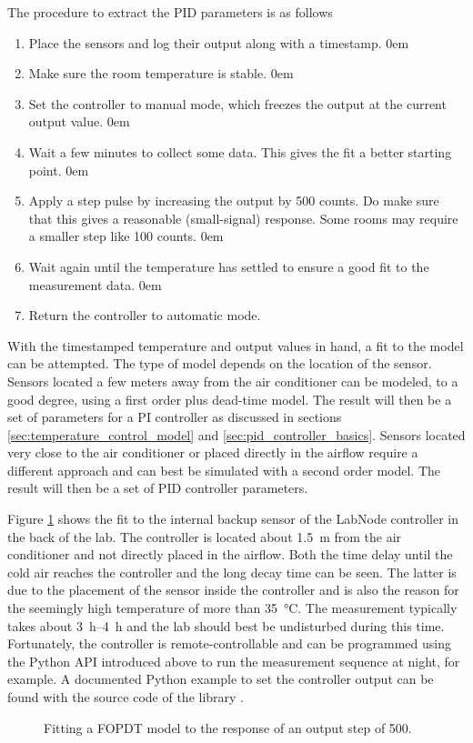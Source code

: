 The procedure to extract the PID parameters is as follows
\begin{enumerate}
    \itemsep0em
    \item Place the sensors and log their output along with a timestamp.
    \itemsep0em
    \item Make sure the room temperature is stable.
    \itemsep0em
    \item Set the controller to manual mode, which freezes the output at the current output value.
    \itemsep0em
    \item Wait a few minutes to collect some data. This gives the fit a better starting point.
    \itemsep0em
    \item Apply a step pulse by increasing the output by 500 counts. Do make sure that this gives a reasonable (small-signal) response. Some rooms may require a smaller step like 100 counts.
    \itemsep0em
    \item Wait again until the temperature has settled to ensure a good fit to the measurement data.
    \itemsep0em
    \item Return the controller to automatic mode.
\end{enumerate}

With the timestamped temperature and output values in hand, a fit to the model can be attempted. The type of model depends on the location of the sensor. Sensors located a few meters away from the air conditioner can be modeled, to a good degree, using a first order plus dead-time model. The result will then be a set of parameters for a PI controller as discussed in sections \ref{sec:temperature_control_model} and \ref{sec:pid_controller_basics}. Sensors located very close to the air conditioner or placed directly in the airflow require a different approach and can best be simulated with a second order model. The result will then be a set of PID controller parameters.

Figure \ref{fig:pid_parameter_fit} shows the fit to the internal backup sensor of the LabNode controller in the back of the lab. The controller is located about \qty{1.5}{\m} from the air conditioner and not directly placed in the airflow. Both the time delay until the cold air reaches the controller and the long decay time can be seen. The latter is due to the placement of the sensor inside the controller and is also the reason for the seemingly high temperature of more than \qty{35}{\celsius}. The measurement typically takes about \qtyrange[range-units = single]{3}{4}{\hour} and the lab should best be undisturbed during this time. Fortunately, the controller is remote-controllable and can be programmed using the Python API introduced above to run the measurement sequence at night, for example. A documented Python example to set the controller output can be found with the source code of the library \cite{git_labnode}.
\begin{figure}[ht]
    \centering
    \caption{Fitting a FOPDT model to the response of an output step of \qty{500}{\bit}.}
    \label{fig:pid_parameter_fit}
\end{figure}

